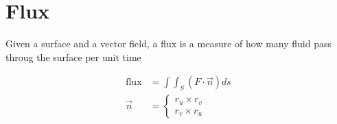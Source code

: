 \section{Flux}

  Given a surface and a vector field, a flux is a measure of how many fluid
  pass throug the surface per unit time

  \begin{align}
    \text{flux} &= \int \int_{S} \left( F \cdot \vec{n} \right) ds \\
    \vec{n} &=
    \begin{cases}
      r_{u} \times r_{v} \\
      r_{v} \times r_{u}
    \end{cases}
  \end{align}